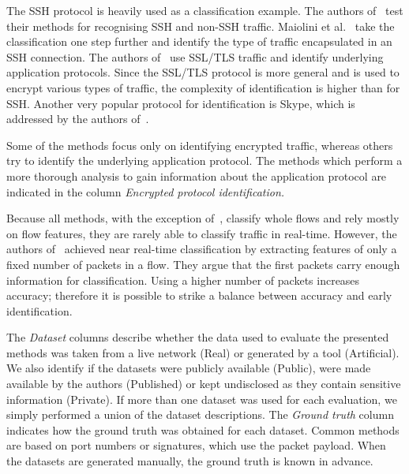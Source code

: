 The SSH protocol is heavily used as a classification example. The authors of~\cite{Alshammari-2009-Classifying, Alshammari-2007-flow, Alshammari-2009-Preliminary, Alshammari-2009-Machine, Alshammari-2011-Can, Arndt-2011-Comparison, Bacquet-2009-Investigation, Bacquet-2011-Genetic, Zhang-2013-Encrypted} test their methods for recognising SSH and non-SSH traffic. Maiolini et al.~\cite{Maiolini-2009-Real} take the classification one step further and identify the type of traffic encapsulated in an SSH connection. The authors of~\cite{Bernaille-2007-Early, Korczynski-2014-Markov, Sun-2010-Novel} use SSL/TLS traffic and identify underlying application protocols. Since the SSL/TLS protocol is more general and is used to encrypt various types of traffic, the complexity of identification is higher than for SSH. Another very popular protocol for identification is Skype, which is addressed by the authors of~\cite{Alshammari-2009-Machine, Alshammari-2011-Can, Korczynski-2012-Classifying, Korczynski-2014-Markov}.

Some of the methods focus only on identifying encrypted traffic, whereas others try to identify the underlying application protocol. The methods which perform a more thorough analysis to gain information about the application protocol are indicated in the column \emph{Encrypted protocol identification.}

Because all methods, with the exception of~\cite{Karagiannis-2005-BLINC}, classify whole flows and rely mostly on flow features, they are rarely able to classify traffic in real-time. However, the authors of~\cite{BarYanai-2010-Realtime, Bernaille-2007-Early, Kumano-2014-Towards, Maiolini-2009-Real, Wang-2011-Using} achieved near real-time classification by extracting features of only a fixed number of packets in a flow. They argue that the first packets carry enough information for classification. Using a higher number of packets increases accuracy; therefore it is possible to strike a balance between accuracy and early identification.

The \emph{Dataset} columns describe whether the data used to evaluate the presented methods was taken from a live network (Real) or generated by a tool (Artificial). We also identify if the datasets were publicly available (Public), were made available by the authors (Published) or kept undisclosed as they contain sensitive information (Private). If more than one dataset was used for each evaluation, we simply performed a union of the dataset descriptions. The \emph{Ground truth} column indicates how the ground truth was obtained for each dataset. Common methods are based on port numbers or signatures, which use the packet payload. When the datasets are generated manually, the ground truth is known in advance.

